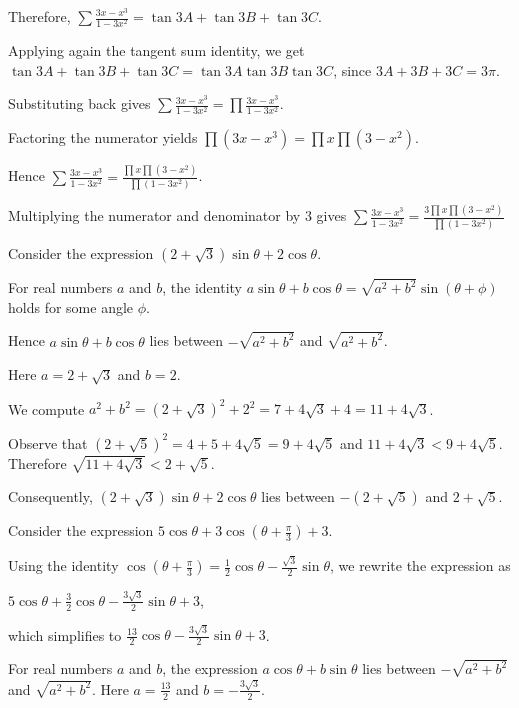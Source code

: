   Therefore,
  $\displaystyle\sum \frac{3x - x^3}{1 - 3x^2}
  = \tan 3A + \tan 3B + \tan 3C$.

  Applying again the tangent sum identity, we get
  $\tan 3A + \tan 3B + \tan 3C
  = \tan 3A \tan 3B \tan 3C$,
  since $3A + 3B + 3C = 3\pi$.

  Substituting back gives
  $\displaystyle\sum \frac{3x - x^3}{1 - 3x^2}
  = \prod \frac{3x - x^3}{1 - 3x^2}$.

  Factoring the numerator yields
  $\prod (3x - x^3) = \prod x \prod (3 - x^2)$.

  Hence
  $\displaystyle\sum \frac{3x - x^3}{1 - 3x^2}
  = \frac{\prod x \prod (3 - x^2)}{\prod (1 - 3x^2)}$.

  Multiplying the numerator and denominator by $3$ gives
  $\displaystyle\sum \frac{3x - x^3}{1 - 3x^2}
  = \frac{3 \prod x \prod (3 - x^2)}{\prod (1 - 3x^2)}$
\item Consider the expression $(2 + \sqrt{3}) \sin \theta + 2 \cos \theta$.

  For real numbers $a$ and $b$, the identity
  $a \sin \theta + b \cos \theta = \sqrt{a^2 + b^2} \sin(\theta + \phi)$
  holds for some angle $\phi$.

  Hence $a \sin \theta + b \cos \theta$ lies between $-\sqrt{a^2 + b^2}$ and $\sqrt{a^2 + b^2}$.

  Here $a = 2 + \sqrt{3}$ and $b = 2$.

  We compute
  $a^2 + b^2 = (2 + \sqrt{3})^2 + 2^2 = 7 + 4 \sqrt{3} + 4 = 11 + 4 \sqrt{3}$.

  Observe that $(2 + \sqrt{5})^2 = 4 + 5 + 4 \sqrt{5} = 9 + 4 \sqrt{5}$ and
  $11 + 4 \sqrt{3} < 9 + 4 \sqrt{5}$.
  Therefore
  $\sqrt{11 + 4 \sqrt{3}} < 2 + \sqrt{5}$.

  Consequently,
  $(2 + \sqrt{3}) \sin \theta + 2 \cos \theta$
  lies between $-(2 + \sqrt{5})$ and $2 + \sqrt{5}$.
\item Consider the expression
  $5 \cos \theta + 3 \cos(\theta + \frac{\pi}{3}) + 3$.

  Using the identity $\cos(\theta + \frac{\pi}{3}) = \frac12 \cos \theta - \frac{\sqrt3}{2} \sin \theta$,
  we rewrite the expression as

  $5 \cos \theta + \frac32 \cos \theta - \frac{3\sqrt3}{2} \sin \theta + 3$,

  which simplifies to
  $\frac{13}{2} \cos \theta - \frac{3\sqrt3}{2} \sin \theta + 3$.

  For real numbers $a$ and $b$, the expression
  $a \cos \theta + b \sin \theta$
  lies between $-\sqrt{a^2 + b^2}$ and $\sqrt{a^2 + b^2}$.
  Here $a = \frac{13}{2}$ and $b = -\frac{3\sqrt3}{2}$.

